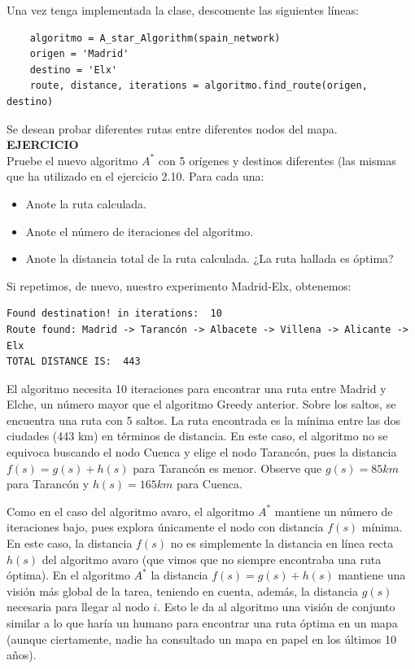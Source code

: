 \documentclass{article}
\begin{document}
Una vez tenga implementada la clase, descomente las siguientes líneas:
\begin{verbatim}
    algoritmo = A_star_Algorithm(spain_network)
    origen = 'Madrid'
    destino = 'Elx'
    route, distance, iterations = algoritmo.find_route(origen, destino)   
\end{verbatim}

\begin{exercise}
Se desean probar diferentes rutas entre diferentes nodos del mapa. \\
\textbf{EJERCICIO}\\
Pruebe el nuevo algoritmo $A^*$ con 5 orígenes y destinos diferentes (las mismas que ha utilizado en el ejercicio 2.10. Para cada una:
    \begin{itemize}
        \item Anote la ruta calculada.
        \item Anote el número de iteraciones del algoritmo.
        \item Anote la distancia total de la ruta calculada. ¿La ruta hallada es óptima?
    \end{itemize}     
\end{exercise}

Si repetimos, de nuevo, nuestro experimento Madrid-Elx, obtenemos:
\begin{verbatim}
Found destination! in iterations:  10
Route found: Madrid -> Tarancón -> Albacete -> Villena -> Alicante -> Elx
TOTAL DISTANCE IS:  443
\end{verbatim}
El algoritmo necesita 10 iteraciones para encontrar una ruta entre Madrid y Elche, un número mayor que el algoritmo Greedy anterior. Sobre los saltos, se encuentra una ruta con 5 saltos. La ruta encontrada es la mínima entre las dos ciudades (443 km) en términos de distancia. En este caso, el algoritmo no se equivoca buscando el nodo Cuenca y elige el nodo Tarancón, pues la distancia $f(s)=g(s) + h(s)$ para Tarancón es menor. Observe que $g(s)=85km$ para Tarancón y $h(s)=165km$ para Cuenca.


Como en el caso del algoritmo avaro, el algoritmo $A^*$ mantiene un número de iteraciones bajo, pues explora únicamente el nodo con distancia $f(s)$ mínima. En este caso, la distancia $f(s)$ no es simplemente la distancia en línea recta $h(s)$ del algoritmo avaro (que vimos que no siempre encontraba una ruta óptima). En el algoritmo $A^*$ la distancia $f(s)=g(s)+h(s)$ mantiene una visión más global de la tarea, teniendo en cuenta, además, la distancia $g(s)$ necesaria para llegar al nodo $i$. Esto le da al algoritmo una visión de conjunto similar a lo que haría un humano para encontrar una ruta óptima en un mapa (aunque ciertamente, nadie ha consultado un mapa en papel en los últimos 10 años).
\end{document}
